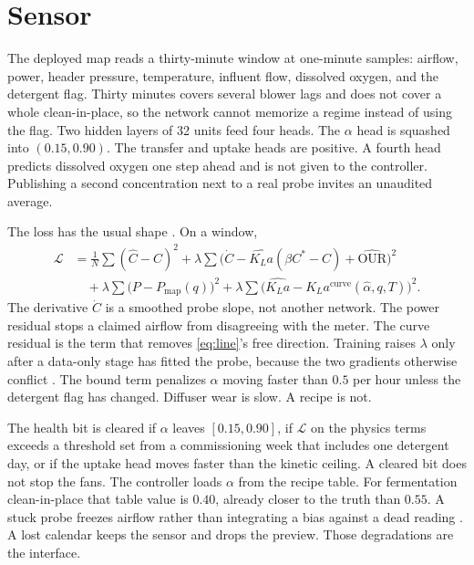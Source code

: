 \documentclass[11pt,a4paper]{article}
\begin{document}
\section{Sensor}

The deployed map reads a thirty-minute window at one-minute samples: airflow, power, header pressure, temperature, influent flow, dissolved oxygen, and the detergent flag. Thirty minutes covers several blower lags and does not cover a whole clean-in-place, so the network cannot memorize a regime instead of using the flag. Two hidden layers of 32 units feed four heads. The \(\alpha\) head is squashed into \((0.15,0.90)\). The transfer and uptake heads are positive. A fourth head predicts dissolved oxygen one step ahead and is not given to the controller. Publishing a second concentration next to a real probe invites an unaudited average.

The loss has the usual shape \cite{raissi2019,karniadakis2021,wang2021}. On a window,
\begin{equation}
\label{eq:loss}
\begin{aligned}
\mathcal{L}
&=
\frac{1}{N}\sum(\hat C-C)^{2}
+
\lambda\sum\Big(
\dot C-\widehat{K_La}(\beta C^{*}-C)+\widehat{\mathrm{OUR}}
\Big)^{2}\\
&\quad
+
\lambda\sum\big(P-P_{\mathrm{map}}(q)\big)^{2}
+
\lambda\sum\big(\widehat{K_La}-K_La^{\mathrm{curve}}(\hat\alpha,q,T)\big)^{2}.
\end{aligned}
\end{equation}
The derivative \(\dot C\) is a smoothed probe slope, not another network. The power residual stops a claimed airflow from disagreeing with the meter. The curve residual is the term that removes \eqref{eq:line}'s free direction. Training raises \(\lambda\) only after a data-only stage has fitted the probe, because the two gradients otherwise conflict \cite{wang2021,koksal2024}. The bound term penalizes \(\alpha\) moving faster than \(0.5\) per hour unless the detergent flag has changed. Diffuser wear is slow. A recipe is not.

The health bit is cleared if \(\alpha\) leaves \([0.15,0.90]\), if \(\mathcal{L}\) on the physics terms exceeds a threshold set from a commissioning week that includes one detergent day, or if the uptake head moves faster than the kinetic ceiling. A cleared bit does not stop the fans. The controller loads \(\alpha\) from the recipe table. For fermentation clean-in-place that table value is \(0.40\), already closer to the truth than \(0.55\). A stuck probe freezes airflow rather than integrating a bias against a dead reading \cite{rieger2003}. A lost calendar keeps the sensor and drops the preview. Those degradations are the interface.
\end{document}
